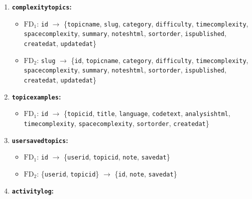 \documentclass[12pt,a4paper]{report}
\DeclareRobustCommand{\_}{\textunderscore\allowbreak}
\begin{document}
\begin{enumerate}
    \begin{itemize}
        \item $\mathrm{FD}_1$: \texttt{id} $\rightarrow$ \{\texttt{user\_id}, \texttt{title}, \texttt{language}, \texttt{code\_text}, \texttt{code\_lines}, \texttt{time\_complexity}, \texttt{space\_complexity}, \texttt{summary}, \texttt{detailed\_analysis}, \texttt{detail\_mode}, \texttt{engine}, \texttt{prompt\_version}, \texttt{created\_at}, \texttt{updated\_at}\}
    \end{itemize}
    \item \textbf{\texttt{complexity\_topics}:}
    \begin{itemize}
        \item $\mathrm{FD}_1$: \texttt{id} $\rightarrow$ \{\texttt{topic\_name}, \texttt{slug}, \texttt{category}, \texttt{difficulty}, \texttt{time\_complexity}, \texttt{space\_complexity}, \texttt{summary}, \texttt{notes\_html}, \texttt{sort\_order}, \texttt{is\_published}, \texttt{created\_at}, \texttt{updated\_at}\}
        \item $\mathrm{FD}_2$: \texttt{slug} $\rightarrow$ \{\texttt{id}, \texttt{topic\_name}, \texttt{category}, \texttt{difficulty}, \texttt{time\_complexity}, \texttt{space\_complexity}, \texttt{summary}, \texttt{notes\_html}, \texttt{sort\_order}, \texttt{is\_published}, \texttt{created\_at}, \texttt{updated\_at}\}
    \end{itemize}
    \item \textbf{\texttt{topic\_examples}:}
    \begin{itemize}
        \item $\mathrm{FD}_1$: \texttt{id} $\rightarrow$ \{\texttt{topic\_id}, \texttt{title}, \texttt{language}, \texttt{code\_text}, \texttt{analysis\_html}, \texttt{time\_complexity}, \texttt{space\_complexity}, \texttt{sort\_order}, \texttt{created\_at}\}
    \end{itemize}
    \item \textbf{\texttt{user\_saved\_topics}:}
    \begin{itemize}
        \item $\mathrm{FD}_1$: \texttt{id} $\rightarrow$ \{\texttt{user\_id}, \texttt{topic\_id}, \texttt{note}, \texttt{saved\_at}\}
        \item $\mathrm{FD}_2$: \{\texttt{user\_id}, \texttt{topic\_id}\} $\rightarrow$ \{\texttt{id}, \texttt{note}, \texttt{saved\_at}\}
    \end{itemize}
    \item \textbf{\texttt{activity\_log}:}

\end{enumerate}
\end{document}
